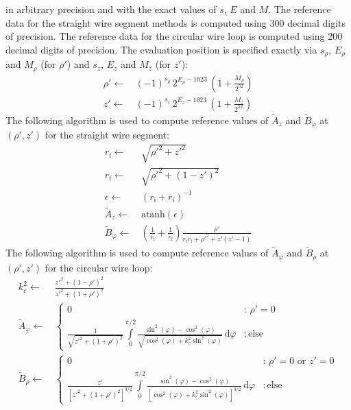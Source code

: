 in arbitrary precision and with the exact values of $s$, $E$ and $M$.
The reference data for the straight wire segment methods
is computed using 300 decimal digits of precision.
The reference data for the circular wire loop
is computed using 200 decimal digits of precision.
The evaluation position is specified exactly
via $s_\rho$, $E_\rho$ and $M_\rho$ (for $\rho'$)
and $s_z$, $E_z$ and $M_z$ (for $z'$):
\begin{align}
 \rho' \leftarrow&\, (-1)^{s_\rho} \, 2^{E_\rho - 1023} \, \left(1 + \frac{M_\rho}{2^{52}}  \right) \nonumber \\
    z' \leftarrow&\, (-1)^{s_z   } \, 2^{E_z    - 1023} \, \left(1 + \frac{M_z   }{2^{52}}  \right)
\end{align}
The following algorithm is used to compute reference values
of $\tilde{A}_z$ and $\tilde{B}_\varphi$ at~$(\rho', z')$
for the straight wire segment:
\begin{align}
  r_\mathrm{i}  \leftarrow&\, \sqrt{ {\rho'}^2 + {z'}^2 } \nonumber \\
  r_\mathrm{f}  \leftarrow&\, \sqrt{ {\rho'}^2 + \left(1 - z'\right)^2 } \label{alg:sws_ref} \\
  \epsilon \leftarrow&\, \left( r_\mathrm{i} + r_\mathrm{f} \right)^{-1} \nonumber \\
  \tilde{A}_z \leftarrow&\, \textrm{atanh} (\epsilon) \label{eqn:sws_A_z_ref} \\
  \tilde{B}_\varphi \leftarrow&\, \left(\frac{1}{r_\mathrm{i}} + \frac{1}{r_\mathrm{f}} \right) \frac{\rho'}{r_\mathrm{i} r_\mathrm{f} + {\rho'}^2 + z' (z' - 1)} \label{eqn:sws_B_phi_ref}
\end{align}
The following algorithm is used to compute reference values
of $\tilde{A}_\varphi$ and $\tilde{B}_\rho$ at~$(\rho', z')$
for the circular wire loop:
\begin{align}
 k_c^2 \leftarrow&\, \frac{{z'}^2 + \left(1 - \rho'\right)^2}{{z'}^2 + \left(1 + \rho'\right)^2} \nonumber \\
 \tilde{A}_\varphi \leftarrow&\,
 \begin{cases}
   0 &:\, \rho' = 0 \\
   \frac{1}{\sqrt{{z'}^2 + \left(1 + \rho'\right)^2}}
                                 \int\limits_0^{\pi/2}
                                   \frac{\sin^2(\varphi) - \cos^2(\varphi)}
                                        {\sqrt{\cos^2(\varphi) + k_c^2 \sin^2(\varphi)}} \,\mathrm{d}\varphi &:\, \textrm{else}
 \end{cases} \label{eqn:A_phi_ref} \\
 \tilde{B}_\rho \leftarrow&\,
 \begin{cases}
   0 &:\, \rho' = 0 \textrm{ or } z' = 0 \\
   \frac{z'}{\left[{z'}^2 + \left(1 + \rho'\right)^2\right]^{3/2}}
                                 \int\limits_0^{\pi/2}
                                   \frac{\sin^2(\varphi) - \cos^2(\varphi)}
                                        {\left[\cos^2(\varphi) + k_c^2 \sin^2(\varphi)\right]^{3/2}} \,\mathrm{d}\varphi &:\, \textrm{else}
 \end{cases} \label{eqn:B_rho_ref}
\end{align}
